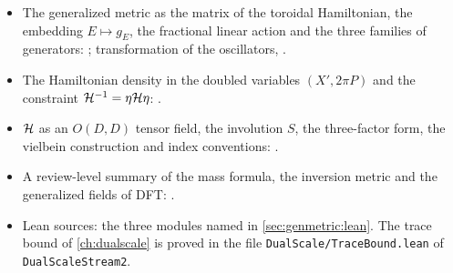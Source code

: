 \begin{itemize}[nosep,leftmargin=*]
\item The generalized metric as the matrix of the toroidal Hamiltonian, the embedding
 $E\mapsto g_E$, the fractional linear action and the three families of generators:
 ; transformation of the oscillators,
 .
\item The Hamiltonian density in the doubled variables $(X',2\pi P)$ and the constraint
 $\mathcal{H}^{-1}=\eta\mathcal{H}\eta$: .
\item $\mathcal{H}$ as an $O(D,D)$ tensor field, the involution $S$, the three-factor form, the
 vielbein construction and index conventions: .
\item A review-level summary of the mass formula, the inversion metric and the
 generalized fields of DFT: .
\item Lean sources: the three modules named in \cref{sec:genmetric:lean}. The trace
 bound of \cref{ch:dualscale} is proved in the file \texttt{DualScale/TraceBound.lean} of
 \texttt{DualScaleStream2}.
\end{itemize}
